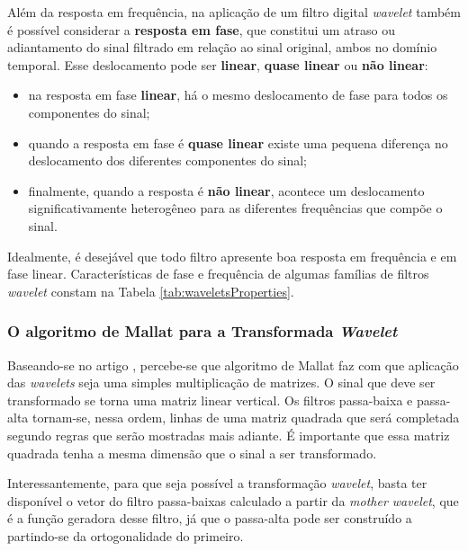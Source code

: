 			\par Além da resposta em frequência, na aplicação de um filtro digital \textit{wavelet} também é possível considerar a \textbf{resposta em fase}, que constitui um atraso ou adiantamento do sinal filtrado em relação ao sinal original, ambos no domínio temporal. Esse deslocamento pode ser \textbf{linear}, \textbf{quase linear} ou \textbf{não linear}: 
	
			\begin{itemize}
				\item na resposta em fase \textbf{linear}, há o mesmo deslocamento de fase para todos os componentes do sinal;
				\item quando a resposta em fase é \textbf{quase linear} existe uma pequena diferença no deslocamento dos diferentes componentes do sinal;
				\item finalmente, quando a resposta é \textbf{não linear}, acontece um deslocamento significativamente heterogêneo para as diferentes frequências que compõe o sinal.
			\end{itemize}
			
			\par Idealmente, é desejável que todo filtro apresente boa resposta em frequência e em fase linear. Características de fase e frequência de algumas famílias de filtros \textit{wavelet} constam na Tabela \autoref{tab:waveletsProperties}.
			
			
	
		\subsubsection{O algoritmo de Mallat para a Transformada \textit{Wavelet}}
			\par Baseando-se no artigo \cite{7079589}, percebe-se que algoritmo de Mallat faz com que aplicação das \textit{wavelets} seja uma simples multiplicação de matrizes. O sinal que deve ser transformado se torna uma matriz linear vertical. Os filtros passa-baixa e passa-alta tornam-se, nessa ordem, linhas de uma matriz quadrada que será completada segundo regras que serão mostradas mais adiante. É importante que essa matriz quadrada tenha a mesma dimensão que o sinal a ser transformado.
			
			\par Interessantemente, para que seja possível a transformação \textit{wavelet}, basta ter disponível o vetor do filtro passa-baixas calculado a partir da \textit{mother wavelet}, que é a função geradora desse filtro, já que o passa-alta pode ser construído a partindo-se da ortogonalidade do primeiro.
			
